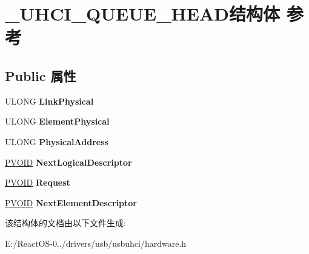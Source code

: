 \hypertarget{struct___u_h_c_i___q_u_e_u_e___h_e_a_d}{}\section{\+\_\+\+U\+H\+C\+I\+\_\+\+Q\+U\+E\+U\+E\+\_\+\+H\+E\+A\+D结构体 参考}
\label{struct___u_h_c_i___q_u_e_u_e___h_e_a_d}
\subsection*{Public 属性}
\begin{DoxyCompactItemize}
\item 
\mbox{\label{struct___u_h_c_i___q_u_e_u_e___h_e_a_d_a167174a0a8b06a30db65d3f43a373f48}} 
U\+L\+O\+NG {\bfseries Link\+Physical}
\item 
\mbox{\label{struct___u_h_c_i___q_u_e_u_e___h_e_a_d_a8fd58e20dc0fb87a4fc16ba0a27c7c98}} 
U\+L\+O\+NG {\bfseries Element\+Physical}
\item 
\mbox{\label{struct___u_h_c_i___q_u_e_u_e___h_e_a_d_a9998e505daf2a553d7e1971bd7de1e24}} 
U\+L\+O\+NG {\bfseries Physical\+Address}
\item 
\mbox{\label{struct___u_h_c_i___q_u_e_u_e___h_e_a_d_a7b31f4f4d215545551ca8743f29b338e}} 
\hyperlink{interfacevoid}{P\+V\+O\+ID} {\bfseries Next\+Logical\+Descriptor}
\item 
\mbox{\label{struct___u_h_c_i___q_u_e_u_e___h_e_a_d_a62dd5d769fce13ba33a79b6353f09b0c}} 
\hyperlink{interfacevoid}{P\+V\+O\+ID} {\bfseries Request}
\item 
\mbox{\label{struct___u_h_c_i___q_u_e_u_e___h_e_a_d_a317c688b9b4551df9cadb0067e3188a6}} 
\hyperlink{interfacevoid}{P\+V\+O\+ID} {\bfseries Next\+Element\+Descriptor}
\end{DoxyCompactItemize}


该结构体的文档由以下文件生成\+:\begin{DoxyCompactItemize}
\item 
E\+:/\+React\+O\+S-\/0../drivers/usb/usbuhci/hardware.\+h\end{DoxyCompactItemize}
